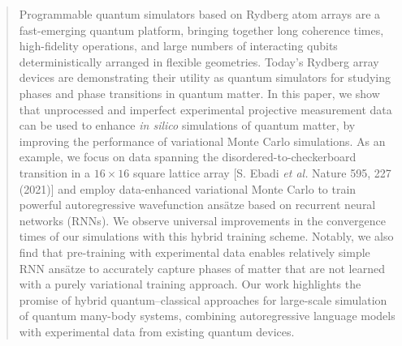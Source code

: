 \documentclass[twocolumn,
                showpacs,
                nofootinbib,
                nobibnotes,
                aps,
                superscriptaddress,
                amssymb,
                amsmath,
                floatfix,
                reprint,
                prx, 
                notitlepage,
                showkeys,
                10pt,
		]{revtex4-2}
\begin{document}
\begin{abstract}
Programmable quantum simulators based on Rydberg atom arrays are a fast-emerging quantum platform, bringing together long coherence times, high-fidelity operations, and large numbers of interacting qubits deterministically arranged in flexible geometries.  Today's Rydberg array devices are demonstrating their utility as quantum simulators for studying phases and phase transitions in quantum matter. In this paper, we show that unprocessed and imperfect experimental projective measurement data can be used to enhance {\it in silico} simulations of quantum matter, by improving the performance of variational Monte Carlo simulations.  As an example, we focus on data spanning the disordered-to-checkerboard transition in a $16 \times 16$ square lattice array [S. Ebadi {\it et al.} Nature  595, 227 (2021)] and employ data-enhanced variational Monte Carlo to train powerful autoregressive wavefunction ans\"atze based on recurrent neural networks (RNNs). We observe universal improvements in the convergence times of our simulations with this hybrid training scheme. Notably, we also find that pre-training with experimental data enables relatively simple RNN ans\"atze to accurately capture phases of matter that are not learned with a purely variational training approach. Our work highlights the promise of hybrid quantum--classical approaches for large-scale simulation of quantum many-body systems, combining autoregressive language models with experimental data from existing quantum devices.
\end{abstract}

\maketitle

%
\end{document}
